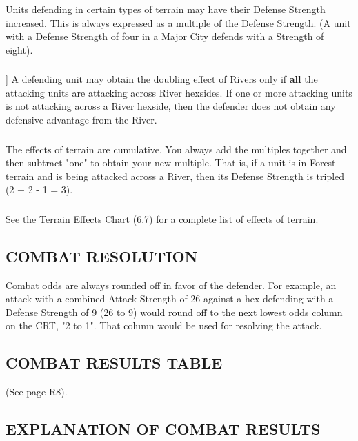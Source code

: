 \subsubsection{} Units defending in certain types of terrain may have their Defense Strength increased. This is always expressed as a multiple of the Defense Strength. (A unit with a Defense Strength of four in a Major City defends with a Strength of eight).

\subsubsection{}] A defending unit may obtain the doubling effect of Rivers only if \textbf{all} the attacking units are attacking across River hexsides. If one or more attacking units is not attacking across a River hexside, then the defender does not obtain any defensive advantage from the River.

\subsubsection{} The effects of terrain are cumulative. You always add the multiples together and then subtract "one" to obtain your new multiple. That is, if a unit is in Forest terrain and is being attacked across a River, then its Defense Strength is tripled (2 + 2 - 1 = 3).

\subsubsection{} See the Terrain Effects Chart (6.7) for a complete list of effects of terrain.

\subsection{COMBAT RESOLUTION}

Combat odds are always rounded off in favor of the defender. For example, an attack with a combined Attack Strength of 26 against a hex defending with a Defense Strength of 9 (26 to 9) would round off to the next lowest odds column on the CRT, "2 to 1". That column would be used for resolving the attack.

\subsection{COMBAT RESULTS TABLE} (See page R8).

\begin{flushleft}
  \subsection{EXPLANATION OF COMBAT RESULTS}
\end{flushleft}

